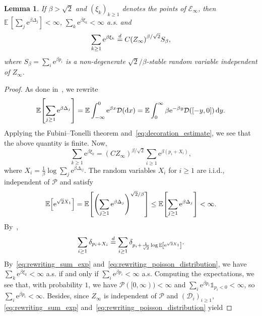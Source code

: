 \documentclass[10pt]{amsart}
\newtheorem{lemm}[theo]{Lemma}\newtheorem{prop}[theo]{Proposition}\newtheorem{coro}[theo]{Corollary}\newtheorem{conj}[theo]{Conjecture}
\theoremstyle{definition}\newtheorem{defi}[theo]{Definition}\newtheorem{rema}[theo]{Remark}\newtheorem{exam}[theo]{Example}\newtheorem{exem}[theo]{Example}\newtheorem{nota}[theo]{Notation}
\newcommand{\e}{\mathrm{e}}
\renewcommand{\d}[1]{\mathop{}\!\mathrm{d}#1}
\newcommand{\E}{\mathbb{E}}
\newcommand\1{\mathds{1}}
\newcommand{\cD}{\mathcal{D}}
\newcommand{\cE}{\mathcal{E}}
\newcommand{\cP}{\mathcal{P}}
\newcommand{\Expec}[1]{\mathbb{E}\left[#1\right]}
\let\originalleft\left
\let\originalright\right
\renewcommand{\left}{\mathopen{}\mathclose\bgroup\originalleft}
\renewcommand{\right}{\aftergroup\egroup\originalright}
\begin{document}
\begin{lemm}\label{lem:sum_gibbs_weights_ppp}
If $\beta > \sqrt{2}$ and $(\xi_k)_{k\geq1}$ denotes the points of $\cE_\infty$, then $\E\,[\sum_j \e^{\beta \Delta_j}] < \infty$, $\sum_k \e^{\beta \xi_k} < \infty$ a.s. and
\begin{equation}\label{eq:rewriting_sum_ppp}
\sum_{k \geq 1} \e^{\beta \xi_k} \overset{d}{=} C \left(Z_\infty\right)^{\beta/\sqrt{2}} S_\beta,
\end{equation}
where $S_\beta = \sum_i \e^{\beta p_i}$ is a non-degenerate $\sqrt{2}/\beta$-stable random variable independent of $Z_\infty$.
\end{lemm}

\begin{proof}
As done in~\cite[Lemma~3.1]{Bonnefont2022}, we rewrite
\begin{equation*}
\Expec{\sum_{j \geq 1} \e^{\beta \Delta_j}} = \E \int_{-\infty}^0 \e^{\beta x} \cD(\d{x}) = \E \int_0^\infty \beta \e^{-\beta y} \cD([-y, 0]) \d{y}.
\end{equation*}
Applying the Fubini--Tonelli theorem and~\eqref{eq:decoration_estimate}, we see that the above quantity is finite. Now,
\begin{equation}\label{eq:rewriting_sum_exp}
\sum_{k \geq 1} \e^{\beta \xi_k} = (C Z_\infty)^{\beta/\sqrt{2}} \sum_{i \geq 1} \e^{\beta(p_i + X_i)},
\end{equation}
where $X_i = \frac{1}{\beta} \log \sum_j \e^{\beta \Delta_{ij}}$. The random variables $X_i$ for $i \geq 1$ are i.i.d., independent of $\cP$ and satisfy
\begin{equation*}
\Expec{\e^{\sqrt{2} X_1}} = \Expec{\Biggl(\sum_{j \geq 1} \e^{\beta \Delta_j}\Biggr)^{\sqrt{2}/\beta}} \leq \Expec{\sum_{j \geq 1} \e^{\beta \Delta_j}} < \infty.
\end{equation*}
By~\cite[Proposition~8.7.a]{BolthausenSznitman2002},
\begin{equation}\label{eq:rewriting_poisson_distribution}
\sum_{i \geq 1} \delta_{p_i + X_i} \overset{d}{=} \sum_{i \geq 1} \delta_{p_i + \frac{1}{\sqrt{2}} \log \Expec{\e^{\sqrt{2} X_1}}}.
\end{equation}
By~\eqref{eq:rewriting_sum_exp} and~\eqref{eq:rewriting_poisson_distribution}, we have $\sum_k \e^{\beta \xi_k} < \infty$ a.s. if and only if $\sum_i \e^{\beta p_i} < \infty$ a.s. Computing the expectations, we see that, with probability $1$, we have $\cP([0, \infty)) < \infty$ and $\sum_i \e^{\beta p_i} \1_{p_i < 0} < \infty$, so $\sum_i \e^{\beta p_i} < \infty$. Besides, since $Z_\infty$ is independent of $\cP$ and $(\cD_i)_{i \geq 1}$, \eqref{eq:rewriting_sum_exp} and~\eqref{eq:rewriting_poisson_distribution} yield

\end{proof}
\end{document}
